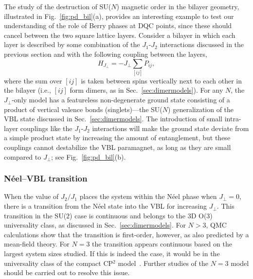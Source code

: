 \documentclass[10pt,pre,aps,twocolumn,showpacs,superscriptaddress,floatfix]{revtex4-1}
\begin{document}
The study of the destruction of SU($N$) magnetic order in the bilayer geometry, illustrated in Fig.~\ref{fig:pd_bil}(a), provides an interesting 
example to test our understanding of the role of Berry phases at DQC points, since these should cancel between the two square lattice layers. 
Consider a bilayer in which each layer is described by some combination of the $J_1$-$J_2$ interactions discussed in the previous section and with
the following coupling between the layers,
\begin{equation}
 H_{J_\perp} = -J_\perp \sum_{[ij]} P_{ij},
\end{equation}
where the sum over $[ij]$ is taken between spins vertically next to each other in the bilayer (i.e., $[ij]$ form dimers, as in Sec.~\ref{sec:dimermodels}). For 
any $N$, the $J_\perp$-only model has a featureless non-degenerate ground state consisting of a product of vertical valence bonds (singlets)---the SU($N$)
generalization of the VBL state discussed in Sec.~\ref{sec:dimermodels}. The introduction of small intra-layer couplings like the $J_1$-$J_2$ interactions will 
make the ground state deviate from a simple product state by increasing the amount of entanglement, but these couplings cannot destabilize the VBL paramagnet,
as long as they are small compared to $J_\perp$; see Fig.~\ref{fig:pd_bil}(b). 

\subsubsection{N\'eel--VBL transition}

When the value of $J_2/J_1$ places the system within the N\'eel phase when $J_\perp=0$, there is a transition from the N\'eel state into the VBL for increasing 
$J_\perp$. This transition in the SU($2$) case is continuous and belongs to the 3D O($3$) universality class, as discussed in Sec.~\ref{sec:dimermodels}. For $N>3$, 
QMC calculations \cite{kaul2012:sun_bil} show that the transition is first-order, however, as also predicted by a mean-field theory. For $N=3$ the transition appears 
continuous based on the largest system sizes studied. If this is indeed the case, it would be in the universality class of the compact CP$^2$ model~\cite{Nahum11}. 
Further studies of the $N=3$ model should be carried out to resolve this issue.
\end{document}
